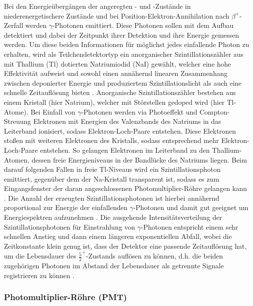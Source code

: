 Bei den Energieübergängen der angeregten \caesium- und \neon-Zustände in niederenergetischere Zustände und bei Position-Elektron-Annihilation nach $\beta^+$-Zerfall
werden $\gamma$-Photonen emittiert. Diese Photonen sollen mit dem Aufbau detektiert und dabei der Zeitpunkt ihrer Detektion und ihre Energie gemessen werden. Um diese beiden Informationen für möglichst jedes einfallende Photon zu erhalten, wird als Teilchendetektortyp ein anorganischer Szintillationszähler aus mit Thallium (Tl) dotierten Natriumiodid (NaI) gewählt, welcher eine hohe Effektivität aufweist \cite{scintimanual} und sowohl einen annähernd linearen Zusammenhang zwischen deponierter Energie und produziertem Szintillationslicht als auch eine schnelle Zeitauflösung bieten \cite[158]{leotechniques}. Anorganische Szintillationszähler bestehen aus einem Kristall (hier Natrium), welcher mit Störstellen gedoped wird (hier Tl-Atome). Bei Einfall von $\gamma$-Photonen werden via Photoeffekt und Compton-Streuung Elektronen mit Energien des Valenzbands des Natriums in das Leiterband ionisiert, sodass Elektron-Loch-Paare entstehen. Diese Elektronen stoßen mit weiteren Elektronen des Kristalls, sodass entsprechend mehr Elektron-Loch-Paare entstehen. So gelangen Elektronen im Leiterband zu den Thallium-Atomen, dessen freie Energieniveaus in der Bandlücke des Natriums liegen. Beim darauf folgenden Fallen in freie Tl-Niveaus wird ein Szintillationsphoton emittiert, gegenüber dem der Na-Kristall transparent ist, sodass es zum Eingangsfenster der daran angeschlossenen Photomultiplier-Röhre gelangen kann \cite[245-246]{mcgregorscintillator}. Die Anzahl der erzeugten Szintillationsphotonen ist hierbei annähernd proportional zur Energie der einfallenden $\gamma$-Photonen und damit gut geeignet um Energiespektren aufzunehmen \cite[167-171]{leotechniques}.
Die ausgehende Intensitätsverteilung der Szintillationsphotonen für Einstrahlung von $\gamma$-Photonen entspricht einem sehr schnellen Anstieg und dann einem längeren exponentiellen Abfall, wobei die Zeitkonstante klein genug ist, dass der Detektor eine passende Zeitauflösung hat, um die Lebensdauer des \caesium $\frac{5}{2}^+$-Zustands auflösen zu können, d.h. die beiden zugehörigen Photonen im Abstand der Lebensdauer als getrennte Signale registrieren zu können \cite[158]{leotechniques}.

\subsubsection{Photomultiplier-Röhre (PMT)} \label{sec:pmtaufbau}

